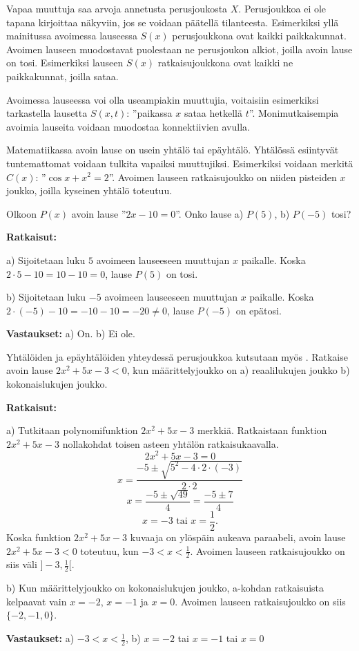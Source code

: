 Vapaa muuttuja saa arvoja annetusta perusjoukosta $X$. Perusjoukkoa ei ole tapana kirjoittaa näkyviin, jos se voidaan päätellä tilanteesta. Esimerkiksi yllä mainitussa avoimessa lauseessa $S(x)$ perusjoukkona ovat kaikki paikkakunnat. Avoimen lauseen  muodostavat puolestaan ne perusjoukon alkiot, joilla avoin lause on tosi. Esimerkiksi lauseen $S(x)$ ratkaisujoukkona ovat kaikki ne paikkakunnat, joilla sataa.

Avoimessa lauseessa voi olla useampiakin muuttujia, voitaisiin esimerkiksi tarkastella lausetta $S(x, t)$: ''paikassa $x$ sataa hetkellä $t$''. Monimutkaisempia avoimia lauseita voidaan muodostaa konnektiivien
avulla.

Matematiikassa avoin lause on usein yhtälö tai epäyhtälö. Yhtälössä esiintyvät tuntemattomat voidaan tulkita vapaiksi muuttujiksi. Esimerkiksi voidaan merkitä $C(x)$: ''$\cos x + x^2= 2$''. Avoimen lauseen ratkaisujoukko on niiden pisteiden $x$ joukko, joilla kyseinen yhtälö toteutuu.

\begin{esimerkki}
Olkoon $P(x)$ avoin lause ''$2x - 10 = 0$''. Onko lause a) $P(5)$, b) $P(-5)$ tosi?

{\bf Ratkaisut:}

a) Sijoitetaan luku $5$ avoimeen lauseeseen muuttujan $x$ paikalle. Koska $2\cdot 5 - 10 = 10 - 10 = 0$, lause $P(5)$ on tosi.

b) Sijoitetaan luku $-5$ avoimeen lauseeseen muuttujan $x$ paikalle. Koska $2\cdot(-5) - 10 = -10 - 10 = -20 \neq 0$, lause $P(-5)$ on epätosi.

{\bf Vastaukset:} a) On. b) Ei ole.
\end{esimerkki}

\begin{esimerkki}
Yhtälöiden ja epäyhtälöiden yhteydessä perusjoukkoa kutsutaan myös . Ratkaise avoin lause $2x^2 + 5x - 3 < 0$, kun määrittelyjoukko on a) reaalilukujen joukko b) kokonaislukujen joukko.

{\bf Ratkaisut:}

a) Tutkitaan polynomifunktion $2x^2 + 5x - 3$ merkkiä. Ratkaistaan funktion $2x^2 + 5x - 3$ nollakohdat toisen asteen yhtälön ratkaisukaavalla.
\[
2x^2 + 5x - 3 = 0
\]
\[
x =\frac{-5\pm\sqrt{5^2-4\cdot 2\cdot(-3)}}{2\cdot 2}
\] 
\[
x = \frac{-5\pm\sqrt{49}}{4} =\frac{-5\pm 7}{4}
\]
\[
x = -3\textrm{  tai  }x =\frac{1}{2}.
\]
Koska funktion $2x^2 + 5x - 3$ kuvaaja on ylöspäin aukeava paraabeli, avoin lause $2x^2 + 5x - 3 < 0$ toteutuu, kun $-3 < x < \frac{1}{2}$. Avoimen lauseen ratkaisujoukko on siis väli $]-3, \frac{1}{2}[$.

b) Kun määrittelyjoukko on kokonaislukujen joukko, a-kohdan ratkaisuista kelpaavat vain $x = -2$, $x = -1$ ja $x = 0$. Avoimen lauseen ratkaisujoukko on siis $\{-2, -1, 0\}$.

{\bf Vastaukset:} a) $-3 < x < \frac{1}{2}$, b) $x = -2$ tai $x = -1$ tai $x = 0$
\end{esimerkki}

